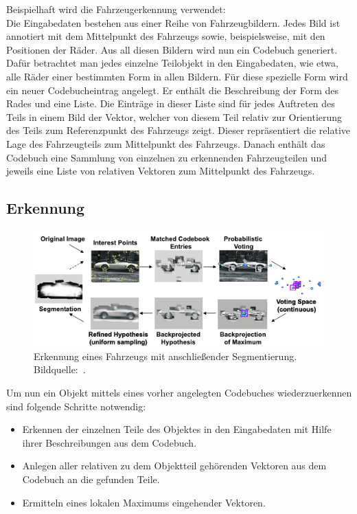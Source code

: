 Beispielhaft wird die Fahrzeugerkennung verwendet: \\
Die Eingabedaten bestehen aus einer Reihe von Fahrzeugbildern.
Jedes Bild ist annotiert mit dem Mittelpunkt des Fahrzeugs sowie, beispielsweise, mit den Positionen der Räder.
Aus all diesen Bildern wird nun ein Codebuch generiert.
Dafür betrachtet man jedes einzelne Teilobjekt in den Eingabedaten, wie etwa, alle Räder einer bestimmten Form in allen Bildern.
Für diese spezielle Form wird ein neuer Codebucheintrag angelegt.
Er enthält die Beschreibung der Form des Rades und eine Liste.
Die Einträge in dieser Liste sind für jedes Auftreten des Teils in einem Bild der Vektor, welcher von diesem Teil relativ zur Orientierung des Teils zum Referenzpunkt des Fahrzeugs zeigt.
Dieser repräsentiert die relative Lage des Fahrzeugteils zum Mittelpunkt des Fahrzeugs.
Danach enthält das Codebuch eine Sammlung von einzelnen zu erkennenden Fahrzeugteilen und jeweils eine Liste von relativen Vektoren zum Mittelpunkt des Fahrzeugs.

\subsection{Erkennung}

\begin{figure}
  \centering
  \includegraphics[width=1.0\textwidth]{bilder/ISM/leibe-car.jpg}
  \caption{Erkennung eines Fahrzeugs mit anschließender Segmentierung. Bildquelle:~\textcite{Leibe04combinedobject}.}
  \label{fig:leibe-car}
\end{figure}

Um nun ein Objekt mittels eines vorher angelegten Codebuches wiederzuerkennen sind folgende Schritte notwendig:

\begin{itemize}
\item Erkennen der einzelnen Teile des Objektes in den Eingabedaten mit Hilfe ihrer Beschreibungen aus dem Codebuch.
\item Anlegen aller relativen zu dem Objektteil gehörenden Vektoren aus dem Codebuch an die gefunden Teile.
\item Ermitteln eines lokalen Maximums eingehender Vektoren.
\end{itemize}


